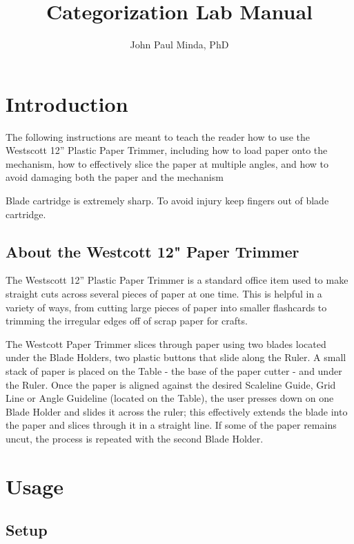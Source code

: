 \documentclass{article}
\title{Categorization Lab Manual}
\author{John Paul Minda, PhD}
\newenvironment{important}[1][]{%
   \begin{mdframed}[%
      backgroundcolor={yellow!15}, hidealllines=true,
      skipabove=0.7\baselineskip, skipbelow=0.7\baselineskip,
      splitbottomskip=2pt, splittopskip=4pt, #1]%
   \makebox[0pt]{%
      \smash{%
         \fontsize{20pt}{20pt}\selectfont%
         \hspace*{-19pt}%
         \raisebox{5pt}{%
            {\color{yellow!100!white}\sffamily\bfseries Caution! }%
         }%
      }%
   }%
}{\end{mdframed}}
\begin{document}
\maketitle
\tableofcontents

\section{Introduction} 
The following instructions are meant to teach the reader how to use the Westscott 12” Plastic Paper Trimmer, including how to load paper onto the mechanism, how to effectively slice the paper at multiple angles, and how to avoid damaging both the paper and the mechanism \newline
\begin{important}
\newline
 Blade cartridge is extremely sharp. To avoid injury keep fingers out of blade cartridge.
\end{important}




\subsection{About the Westcott 12" Paper Trimmer}
The Westscott 12” Plastic Paper Trimmer is a standard office item used to make straight cuts across several pieces of paper at one time. This is helpful in a variety of ways, from cutting large pieces of paper into smaller flashcards to trimming the irregular edges off of scrap paper for crafts.

The Westcott Paper Trimmer slices through paper using two blades located under the Blade Holders, two plastic buttons that slide along the Ruler. A small stack of paper is placed on the Table - the base of the paper cutter - and under the Ruler.  Once the paper is aligned against the desired Scaleline Guide, Grid Line or Angle Guideline (located on the Table), the user presses down on one Blade Holder and slides it across the ruler; this effectively extends the blade into the paper and slices through it in a straight line. If some of the paper remains uncut, the process is repeated with the second Blade Holder.



\section{Usage}

\subsection{Setup}
\end{document}
